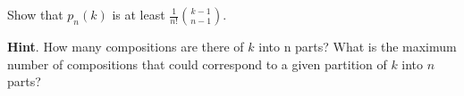 \documentclass{book}
\begin{document}
\setcounter{cpjt}{211}
\addtocounter{cpjt}{-1}
\begin{activity}\label{activity-204}
\hypertarget{p-1130}{}%
Show that \(p_n(k)\) is at least \(\frac{1}{n!}\binom{k-1}{n-1}\).%
\par\smallskip%
\noindent\textbf{Hint}.\hypertarget{hint-132}{}\quad%
\hypertarget{p-1131}{}%
How many compositions are there of \(k\) into n parts? What is the maximum number of compositions that could correspond to a given partition of \(k\) into \(n\) parts?%
\par\smallskip%
\noindent\end{activity}

\clearpage
\end{document}
